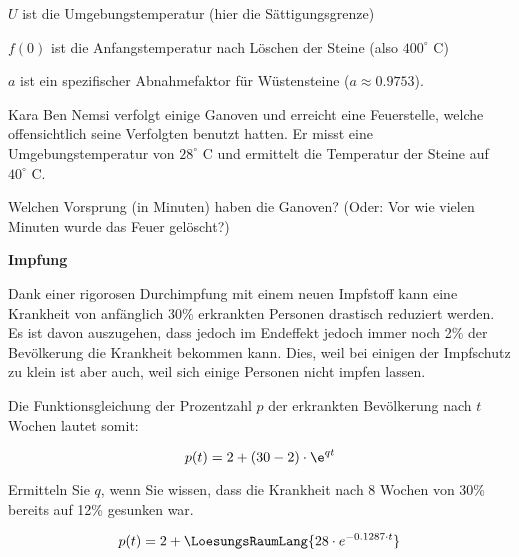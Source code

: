 $U$ ist die Umgebungstemperatur (hier die Sättigungsgrenze)

$f(0)$ ist die Anfangstemperatur nach Löschen der Steine (also $400^\circ$ C)

$a$ ist ein spezifischer Abnahmefaktor für Wüstensteine ($a\approx 0.9753$).


Kara Ben Nemsi verfolgt einige Ganoven und erreicht eine Feuerstelle, welche offensichtlich seine Verfolgten benutzt hatten. Er misst eine Umgebungstemperatur von $28^\circ$ C und ermittelt die Temperatur der Steine auf $40^\circ$ C.

Welchen Vorsprung (in Minuten) haben die Ganoven? (Oder: Vor wie vielen Minuten wurde das Feuer gelöscht?)


\platzFuerBerechnungenBisEndeSeite{}



\bbwActAufgabenNr{} \textbf{Impfung}
\nextBbwAufgabenNummer{}

Dank einer rigorosen Durchimpfung mit einem neuen Impfstoff kann eine Krankheit von anfänglich 30\% erkrankten Personen
drastisch reduziert werden. Es ist davon auszugehen, dass jedoch im
Endeffekt jedoch immer noch 2\% der Bevölkerung die Krankheit bekommen
kann. Dies, weil bei einigen der Impfschutz zu klein ist aber auch,
weil sich einige Personen nicht impfen lassen.

Die Funktionsgleichung der Prozentzahl $p$ der erkrankten Bevölkerung nach $t$ Wochen lautet somit:

$$p(t) = 2 + (30-2)\cdot \e^{qt}$$

Ermitteln Sie $q$, wenn Sie wissen, dass die Krankheit nach 8 Wochen von 30\% bereits auf 12\% gesunken war.

$$p(t) = 2 + \LoesungsRaumLang{28\cdot{}e^{-0.1287\cdot{}t}}$$


\platzFuerBerechnungenBisEndeSeite{}



